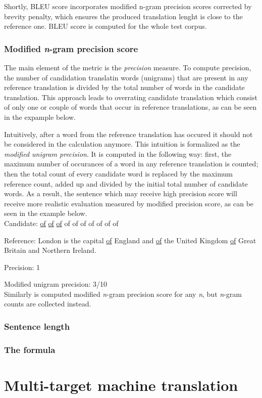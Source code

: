 Shortly, BLEU score incorporates modified n-gram precision scores corrected by brevity penalty,
which ensures the produced translation lenght is close to the reference one.
BLEU score is computed for the whole test corpus.

\subsubsection*{Modified \textit{n}-gram precision score}

The main element of the metric is the \textit{precision} measure.
To compute precision, the number of candidation translatin words (unigrams) that are present in
any reference translation is divided by the total number of words in the candidate translation.
This approach leads to overrating candidate translation which consist of only one or couple of
words that occur in reference translations, as can be seen in the expample below.

Intuitively, after a word from the reference translation has occured it should not be considered
in the calculation anymore. This intuition is formalized as the \textit{modified unigram precision}.
It is computed in the following way: first, the maximum number of occurances of a word in any
reference translation is counted; then the total count of every candidate word is replaced by the
maximum reference count, added up and divided by the initial total number of candidate words.
As a result, the sentence which may receive high precision score will receive more realistic evaluation
measured by modified precision score, as can be seen in the example below.\\

Candidate: \underline{of} \underline{of} \underline{of} of of of of of of of

Reference: London is the capital \underline{of} England and \underline{of} the United Kingdom
\underline{of} Great Britain and Northern Ireland.

Precision: 1

Modified unigram precision: 3/10
\\
Similarly is computed modified \textit{n}-gram precision score for any \textit{n}, but \textit{n}-gram
counts are collected instead.

\subsubsection*{Sentence length}

\subsubsection*{The formula}


\section{Multi-target machine translation}
\label{section:multitarget_mt}

